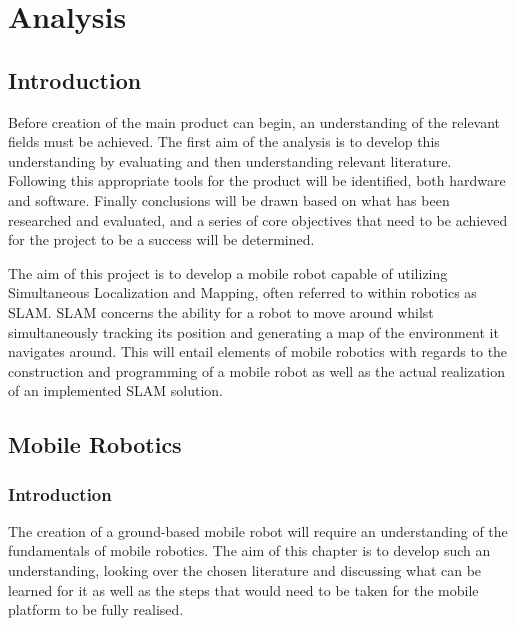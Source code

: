 \part{Analysis}
		\chapter{Introduction}
		Before creation of the main product can begin, an understanding of the relevant fields must be achieved. The first aim of the analysis is to develop this understanding by evaluating and then understanding relevant literature. Following this appropriate tools for the product will be identified, both hardware and software. Finally conclusions will be drawn based on what has been researched and evaluated, and a series of core objectives that need to be achieved for the project to be a success will be determined.

		The aim of this project is to develop a mobile robot capable of utilizing Simultaneous Localization and Mapping, often referred to within robotics as SLAM. SLAM concerns the ability for a robot to move around whilst simultaneously tracking its position and generating a map of the environment it navigates around. This will entail elements of mobile robotics with regards to the construction and programming of a mobile robot as well as the actual realization of an implemented SLAM solution.
		
		
		
		
		\chapter{Mobile Robotics}
		\label{litreview:mobilerobotics}
			\section{Introduction}
			The creation of a ground-based mobile robot will require an understanding of the fundamentals of mobile robotics. The aim of this chapter is to develop such an understanding, looking over the chosen literature and discussing what can be learned for it as well as the steps that would need to be taken for the mobile platform to be fully realised.
			
